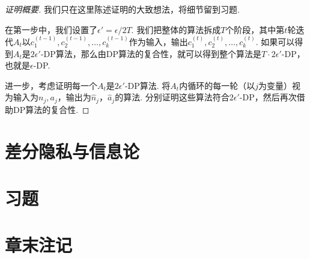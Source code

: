 \begin{proof}[证明概要]
我们只在这里陈述证明的大致想法，将细节留到习题.

在第一步中，我们设置了$\epsilon' = \epsilon / 2 T$. 我们把整体的算法拆成$T$个阶段，其中第$t$轮迭代$A_t$以$c_1^{(t-1)},c_2^{(t-1)},\dots,c_k^{(t-1)}$作为输入，输出$c_1^{(t)},c_2^{(t)},\dots,c_k^{(t)}$. 如果可以得到$A_t$是$2 \epsilon'$-DP算法，那么由DP算法的复合性，就可以得到整个算法是$T \cdot 2\epsilon'$-DP，也就是$\epsilon$-DP.

进一步，考虑证明每一个$A_t$是$2 \epsilon'$-DP算法. 将$A_t$内循环的每一轮（以$j$为变量）视为输入为$n_j,a_j$，输出为$\hat{n}_j$，$\hat{a}_j$的算法. 分别证明这些算法符合$2\epsilon'$-DP，然后再次借助DP算法的复合性.
\end{proof}

\section{差分隐私与信息论}

\section{习题}

\section{章末注记}
